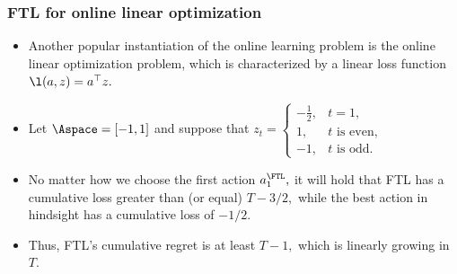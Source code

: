 \documentclass[11pt,compress,t,notes=noshow, xcolor=table]{beamer}
\begin{document}
	
	
	
	
	\sloppy
	


\begin{frame} \frametitle{FTL for online linear optimization}
	\small
	\begin{itemize}
		\item Another popular instantiation of the online learning problem is the online linear optimization problem, which is characterized by a linear loss function $\l(a,z)=a^\top z.$ 
		\pause
		\item  Let $\Aspace=[-1,1]$ and  suppose that 
		$  z_t = \begin{cases}
			-\frac12, & \mbox{$t=1,$} \\
			1, & \mbox{$t$ is even,}\\
			-1, & \mbox{$t$ is odd.}
		\end{cases} $
		\pause 
		\item No matter how we choose the first action $a_1^{\FTL},$ it will hold that FTL has a cumulative loss greater than (or equal) $T-3/2,$ while the best action in hindsight has a cumulative loss of $-1/2.$ 
		\item Thus, FTL's cumulative regret is at least $T-1,$ which is linearly growing in $T.$
	\end{itemize}
\end{frame}
\end{document}
